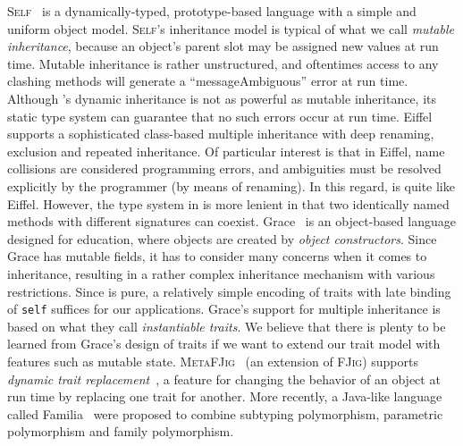 \textsc{Self}~\citep{ungar1988self} is a dynamically-typed, prototype-based
language with a simple and uniform object model. \textsc{Self}'s inheritance
model is typical of what we call \emph{mutable inheritance}, because an
object's parent slot may be assigned new values at run time. Mutable inheritance
is rather unstructured, and oftentimes access to any clashing methods will
generate a ``messageAmbiguous'' error at run time. Although \sedel's dynamic
inheritance is not as powerful as mutable inheritance, its static type system
can guarantee that no such errors occur at run time.
Eiffel~\citep{meyer1987eiffel} supports a sophisticated class-based multiple
inheritance with deep renaming, exclusion and repeated inheritance. Of
particular interest is that in Eiffel, name collisions are considered
programming errors, and ambiguities must be resolved explicitly by the
programmer (by means of renaming). In this regard, \sedel is quite like Eiffel.
However, the type system in \sedel is more lenient in that two identically named
methods with different signatures can coexist.
Grace~\citep{DBLP:journals/jot/NobleBBHJ17, DBLP:conf/ecoop/0002HNB16} is an
object-based language designed for education, where objects are created by
\emph{object constructors}.
Since Grace has mutable fields, it has to consider
many concerns when it comes to inheritance, resulting in a rather complex
inheritance mechanism with various restrictions.
Since \sedel is pure, a relatively simple
encoding of traits with late binding of \lstinline{self}
suffices for our applications. Grace's support for multiple inheritance is
based on what they call \emph{instantiable traits}.
We believe that there is plenty to be learned from Grace's design of traits if
we want to extend our trait model with features such as mutable state.
\textsc{MetaFJig}~\citep{SERVETTO2014219} (an extension of \textsc{FJig})
supports \emph{dynamic trait replacement}~\citep{chai_trait, BETTINI2013907,
  Ducasse_2006}, a feature for changing the behavior of an object at run time by
replacing one trait for another. More recently, a Java-like language called
Familia~\citep{Zhang_2017} were proposed to combine subtyping polymorphism,
parametric polymorphism and family polymorphism.


